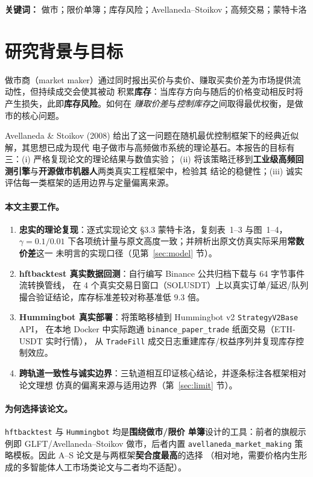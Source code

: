 \documentclass[11pt]{ctexart}
\newcommand{\keywords}[1]{\medskip\noindent\textbf{关键词：} #1}
\begin{document}
\keywords{做市；限价单簿；库存风险；Avellaneda--Stoikov；高频交易；蒙特卡洛}

\newpage
\tableofcontents
\newpage
{}
\setcounter{page}{1}

\section{研究背景与目标}
做市商（market maker）通过同时报出买价与卖价、赚取买卖价差为市场提供流动性，但持续成交会使其被动
积累\textbf{库存}：当库存方向与随后的价格变动相反时将产生损失，此即\textbf{库存风险}。如何在
\emph{赚取价差}与\emph{控制库存}之间取得最优权衡，是做市的核心问题。

Avellaneda \& Stoikov (2008) 给出了这一问题在随机最优控制框架下的经典近似解，其思想已成为现代
电子做市与高频做市系统的理论基石。本报告的目标有三：(i) 严格复现论文的理论结果与数值实验；
(ii) 将该策略迁移到\textbf{工业级高频回测引擎}与\textbf{开源做市机器人}两类真实工程框架中，检验其
结论的稳健性；(iii) 诚实评估每一类框架的适用边界与定量偏离来源。

\paragraph{本文主要工作。}\begin{enumerate}[leftmargin=1.6em,itemsep=1pt]
\item \textbf{忠实的理论复现}：逐式实现论文 §3.3 蒙特卡洛，复刻表~1--3 与图~1--4，
$\gamma=0.1/0.01$ 下各项统计量与原文高度一致；并辨析出原文仿真实际采用\textbf{常数价差}这一
未明言的实现口径（见第~\ref{sec:model} 节）。
\item \textbf{hftbacktest 真实数据回测}：自行编写 Binance 公共归档下载与 64 字节事件流转换管线，
在 4 个真实交易日窗口（SOLUSDT）上以真实订单/延迟/队列撮合验证结论，库存标准差较对称基准低
$9.3$ 倍。
\item \textbf{Hummingbot 真实部署}：将策略移植到 Hummingbot v2 \texttt{StrategyV2Base} API，
在本地 Docker 中实际跑通 \texttt{binance\_paper\_trade} 纸面交易（ETH-USDT 实时行情），
从 \texttt{TradeFill} 成交日志重建库存/权益序列并复现库存控制效应。
\item \textbf{跨轨道一致性与诚实边界}：三轨道相互印证核心结论，并逐条标注各框架相对论文理想
仿真的偏离来源与适用边界（第~\ref{sec:limit} 节）。
\end{enumerate}

\paragraph{为何选择该论文。}\texttt{hftbacktest} 与 \texttt{Hummingbot} 均是\textbf{围绕做市/限价
单簿}设计的工具：前者的旗舰示例即 GLFT/Avellaneda--Stoikov 做市，后者内置
\texttt{avellaneda\_market\_making} 策略模板。因此 A--S 论文是与两框架\textbf{契合度最高}的选择
（相对地，需要价格内生形成的多智能体人工市场类论文与二者均不适配）。
\end{document}
